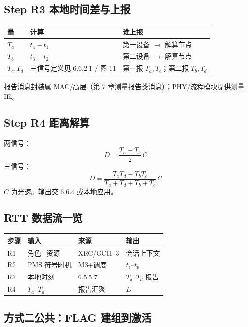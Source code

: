 \documentclass[11pt,a4paper]{ctexart}
\begin{document}
\subsection{Step R3 本地时间差与上报}

\begin{table}[h]
\centering
\small
\begin{tabular}{L{2.2cm}L{4cm}L{6.5cm}}
\toprule
\textbf{量} & \textbf{计算} & \textbf{谁上报} \\
\midrule
$T_a$ & $t_4-t_1$ & 第一设备 $\rightarrow$ 解算节点 \\
$T_b$ & $t_3-t_2$ & 第二设备 $\rightarrow$ 解算节点 \\
$T_c,T_d$ & 三信号定义见 6.6.2.1 / 图 11 & 第一报 $T_a,T_c$；第二报 $T_b,T_d$ \\
\bottomrule
\end{tabular}
\end{table}

报告消息封装属 MAC/高层（第 7 章测量报告类消息）；PHY/流程模块提供测量 IE。

\subsection{Step R4 距离解算}

两信号：
\[
D=\frac{T_a-T_b}{2}\,C
\]
三信号：
\[
D=\frac{T_a T_d-T_b T_c}{T_a+T_d+T_b+T_c}\,C
\]
$C$ 为光速。输出交 6.6.4 或本地应用。

\subsection{RTT 数据流一览}

\begin{table}[h]
\centering
\small
\begin{tabular}{llll}
\toprule
\textbf{步骤} & \textbf{输入} & \textbf{来源} & \textbf{输出} \\
\midrule
R1 & 角色+资源 & XRC/GCI1--3 & 会话上下文 \\
R2 & PMS 符号时机 & M3+调度 & $t_1$--$t_6$ \\
R3 & 本地时刻 & 6.5.5.7 & $T_a$--$T_d$ 报告 \\
R4 & $T_a$--$T_d$ & 报告汇聚 & $D$ \\
\bottomrule
\end{tabular}
\end{table}

\subsection{方式二公共：FLAG 建组到激活}
\end{document}
